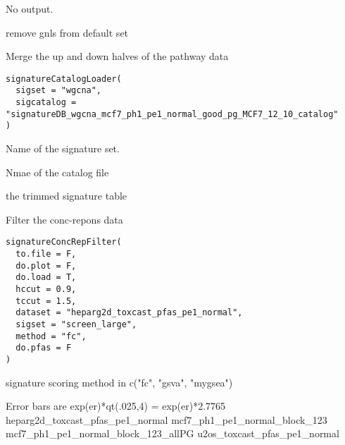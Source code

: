 \documentclass[letterpaper]{book}
\begin{document}
%
\begin{Value}
No output.

remove gnls from default set
\end{Value}
%
\begin{Description}\relax
Merge the up and down halves of the pathway data
\end{Description}
%
\begin{Usage}
\begin{verbatim}
signatureCatalogLoader(
  sigset = "wgcna",
  sigcatalog = "signatureDB_wgcna_mcf7_ph1_pe1_normal_good_pg_MCF7_12_10_catalog"
)
\end{verbatim}
\end{Usage}
%
\begin{Arguments}
\begin{ldescription}
\item[\code{sigset}] Name of the signature set.

\item[\code{sigcatlog}] Nmae of the catalog file
\end{ldescription}
\end{Arguments}
%
\begin{Value}
the trimmed signature table
\end{Value}
%
\begin{Description}\relax
Filter the conc-repons data
\end{Description}
%
\begin{Usage}
\begin{verbatim}
signatureConcRepFilter(
  to.file = F,
  do.plot = F,
  do.load = T,
  hccut = 0.9,
  tccut = 1.5,
  dataset = "heparg2d_toxcast_pfas_pe1_normal",
  sigset = "screen_large",
  method = "fc",
  do.pfas = F
)
\end{verbatim}
\end{Usage}
%
\begin{Arguments}
\begin{ldescription}
\item[\code{method}] signature scoring method in c("fc", "gsva", "mygsea")


Error bars are exp(er)*qt(.025,4) = exp(er)*2.7765
heparg2d\_toxcast\_pfas\_pe1\_normal
mcf7\_ph1\_pe1\_normal\_block\_123
mcf7\_ph1\_pe1\_normal\_block\_123\_allPG
u2os\_toxcast\_pfas\_pe1\_normal
\end{ldescription}
\end{Arguments}
\end{document}
